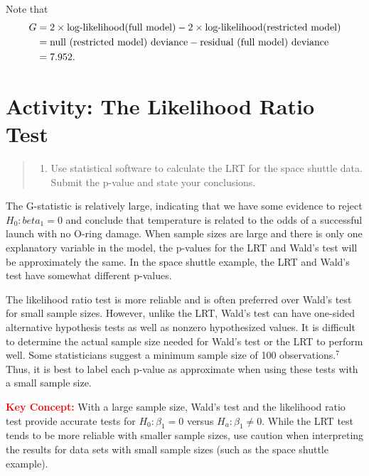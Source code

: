 \documentclass[
]{report}
\providecommand{\tightlist}{%
  \setlength{\itemsep}{0pt}\setlength{\parskip}{0pt}}
\begin{document}
Note that
\begin{align}
G &= 2 \times \text{log-likelihood(full model)} - 2 \times \text{log-likelihood(restricted model)} \notag \\
&= \text{null (restricted model) deviance} - \text{residual (full model) deviance} \notag \\
&= 7.952. \notag 
\end{align}

\hypertarget{activity-the-likelihood-ratio-test-1}{%
\section*{Activity: The Likelihood Ratio Test}\label{activity-the-likelihood-ratio-test-1}}

\begin{quote}
\begin{enumerate}
\def\labelenumi{\arabic{enumi}.}
\setcounter{enumi}{13}
\tightlist
\item
  Use statistical software to calculate the LRT for the space shuttle data. Submit the p-value and state your conclusions.
\end{enumerate}
\end{quote}

The G-statistic is relatively large, indicating that we have some evidence to reject \(H_0: beta_1 = 0\) and conclude that temperature is related to the odds of a successful launch with no O-ring damage. When sample sizes are large and there is only one explanatory variable in the model, the p-values for the LRT and Wald's test will be approximately the same. In the space shuttle example, the LRT and Wald's test have somewhat different p-values.

The likelihood ratio test is more reliable and is often preferred over Wald's test for small sample sizes. However, unlike the LRT, Wald's test can have one-sided alternative hypothesis tests as well as nonzero hypothesized values. It is difficult to determine the actual sample size needed for Wald's test or the LRT to perform well. Some statisticians suggest a minimum sample size of 100 observations.\(^7\) Thus, it is best to label each p-value as approximate when using these tests with a small sample size.

\Large

\textbf{\textcolor{red}{Key Concept:}}
\color{red}
With a large sample size, Wald's test and the likelihood ratio test provide accurate tests for \(H_0: \beta_1 = 0\) versus \(H_a: \beta_1 \neq 0\). While the LRT test tends to be more reliable with smaller sample sizes, use caution when interpreting the results for data sets with small sample sizes (such as the space shuttle example).
\color{black}
\normalsize
\end{document}
